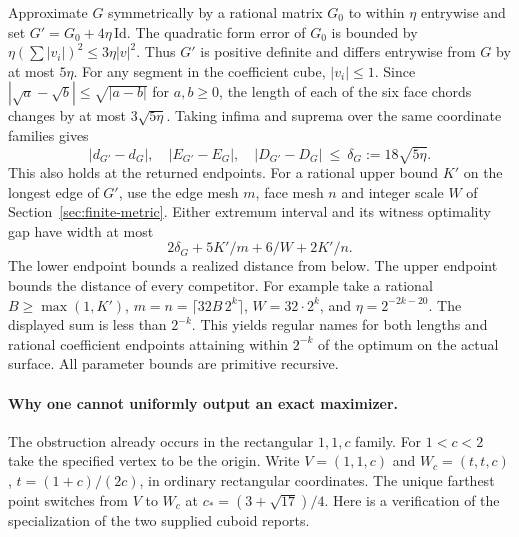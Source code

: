 \documentclass[10pt,letterpaper]{article}
\begin{document}
Approximate $G$ symmetrically by a rational matrix $G_0$ to within
$\eta$ entrywise and set $G'=G_0+4\eta\,\mathrm{Id}$. The quadratic
form error of $G_0$ is bounded by $\eta(\sum |v_i|)^2\le3\eta |v|^2$.
Thus $G'$ is positive definite and differs entrywise from $G$ by at
most $5\eta$. For any segment in the coefficient cube, $|v_i|\le1$.
Since $|\sqrt a-\sqrt b|\le\sqrt{|a-b|}$ for $a,b\ge0$, the length
of each of the six face chords changes by at most $3\sqrt{5\eta}$.
Taking infima and suprema over the same coordinate families gives
\[
 |d_{G'}-d_G|,\quad |E_{G'}-E_G|,\quad |D_{G'}-D_G|
       \ \le\ \delta_G:=18\sqrt{5\eta}.
\]
This also holds at the returned endpoints. For a rational upper bound
$K'$ on the longest edge of $G'$, use the edge mesh $m$, face mesh $n$
and integer scale $W$ of Section~\ref{sec:finite-metric}. Either
extremum interval and its witness optimality gap have width at most
\[
    2\delta_G+5K'/m+6/W+2K'/n.
\]
The lower endpoint bounds a realized distance from below. The upper
endpoint bounds the distance of every competitor. For example take a
rational $B\ge\max(1,K')$, $m=n=\lceil32B\,2^k\rceil$,
$W=32\cdot2^k$, and $\eta=2^{-2k-20}$. The displayed sum is less
than $2^{-k}$. This yields regular names for both lengths and rational
coefficient endpoints attaining within $2^{-k}$ of the optimum on
the actual surface. All parameter bounds are primitive recursive.

\paragraph{Why one cannot uniformly output an exact maximizer.}
The obstruction already occurs in the rectangular $1,1,c$ family.
For $1<c<2$ take the specified vertex to be the origin. Write
$V=(1,1,c)$ and $W_c=(t,t,c)$, $t=(1+c)/(2c)$, in ordinary
rectangular coordinates. The unique farthest point switches from $V$
to $W_c$ at $c_*=(3+\sqrt{17})/4$. Here is a verification of the
specialization of the two supplied cuboid reports.
\end{document}
